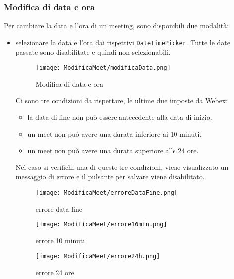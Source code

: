 \subsubsection{Modifica di data e ora}
Per cambiare la data e l'ora di un meeting, sono disponibili due modalità: 
\begin{itemize}
    \item selezionare la data e l'ora dai rispettivi \texttt{DateTimePicker}. Tutte le date passate sono disabilitate e quindi non selezionabili.
    \begin{figure}[H]   
        \centering
        \texttt{[image: ModificaMeet/modificaData.png]}
        \caption{Modifica di data e ora}
    \end{figure}
    Ci sono tre condizioni da rispettare, le ultime due imposte da Webex: 
        \begin{itemize}
            \item la data di fine non può essere antecedente alla data di inizio.
            \item un meet non può avere una durata inferiore ai 10 minuti.
            \item un meet non può avere una durata superiore alle 24 ore.
        \end{itemize}
    Nel caso si verifichi una di queste tre condizioni, viene visualizzato un messaggio di errore e il pulsante per salvare viene disabilitato.
    \begin{figure}[H]
        \centering
        \begin{minipage}{0.45\textwidth}
            \centering
            \texttt{[image: ModificaMeet/erroreDataFine.png]}
            \caption{errore data fine}
        \end{minipage}
        \hspace{0.05\textwidth}
        \begin{minipage}{0.45\textwidth}
            \centering
            \texttt{[image: ModificaMeet/errore10min.png]}
            \caption{errore 10 minuti}
        \end{minipage}
        \hspace{0.05\textwidth}
        \begin{minipage}{0.45\textwidth}
            \centering
            \texttt{[image: ModificaMeet/errore24h.png]}
            \caption{errore 24 ore}
        \end{minipage}
    \end{figure}

\end{itemize}
